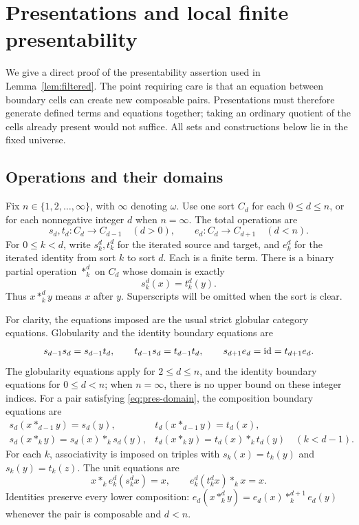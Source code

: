 \section{Presentations and local finite presentability}
\label{app:presentability}

We give a direct proof of the presentability assertion used in
Lemma~\ref{lem:filtered}. The point requiring care is that an equation
between boundary cells can create new composable pairs. Presentations
must therefore generate defined terms and equations together; taking
an ordinary quotient of the cells already present would not suffice.
All sets and constructions below lie in the fixed universe.

\subsection{Operations and their domains}

Fix $n\in\{1,2,\ldots,\infty\}$, with $\infty$ denoting $\omega$.
Use one sort $C_d$ for each $0\le d\le n$, or for each nonnegative
integer $d$ when $n=\infty$. The total operations are
\[
 s_d,t_d:C_d\longrightarrow C_{d-1}\quad(d>0),
 \qquad
 e_d:C_d\longrightarrow C_{d+1}\quad(d<n).
\]
For $0\le k<d$, write $s_k^d,t_k^d$ for the iterated source and
target, and $e_k^d$ for the iterated identity from sort $k$ to
sort $d$. Each is a finite term. There is a binary partial operation
$*_k^d$ on $C_d$ whose domain is exactly
\begin{equation}\label{eq:pres-domain}
 s_k^d(x)=t_k^d(y).
\end{equation}
Thus $x*_k^d y$ means $x$ after $y$. Superscripts will be omitted
when the sort is clear.

For clarity, the equations imposed are the usual strict globular
category equations. Globularity and the identity boundary equations are
\[
 s_{d-1}s_d=s_{d-1}t_d,\qquad
 t_{d-1}s_d=t_{d-1}t_d,\qquad
 s_{d+1}e_d=\mathrm{id}=t_{d+1}e_d.
\]
The globularity equations apply for $2\le d\le n$, and the identity
boundary equations for $0\le d<n$; when $n=\infty$, there is no upper
bound on these integer indices.
For a pair satisfying \eqref{eq:pres-domain}, the composition boundary
equations are
\[
\begin{array}{ll}
 s_d(x*_{d-1}y)=s_d(y),&
 t_d(x*_{d-1}y)=t_d(x),\\[2pt]
 s_d(x*_k y)=s_d(x)*_k s_d(y),&
 t_d(x*_k y)=t_d(x)*_k t_d(y)\quad(k<d-1).
\end{array}
\]
For each $k$, associativity is imposed on triples with
$s_k(x)=t_k(y)$ and $s_k(y)=t_k(z)$. The unit equations are
\[
 x*_k e_k^d(s_k^d x)=x,\qquad
 e_k^d(t_k^d x)*_k x=x.
\]
Identities preserve every lower composition:
$e_d(x*_k^d y)=e_d(x)*_k^{d+1}e_d(y)$ whenever the pair is
composable and $d<n$.

